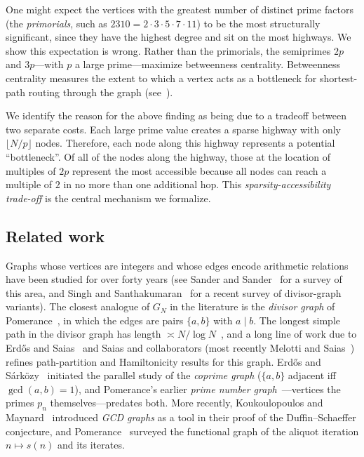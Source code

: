 \documentclass[11pt]{article}
\theoremstyle{plain}
\theoremstyle{definition}
\begin{document}
One might expect the vertices with the greatest number of distinct prime factors (the \emph{primorials}, such as $2310 = 2 \cdot 3 \cdot 5 \cdot 7 \cdot 11$)
to be the most structurally significant, since they have the highest degree and sit on the most highways. We show this expectation is wrong.
Rather than the primorials, the semiprimes $2p$ and $3p$---with $p$ a large prime---maximize betweenness centrality.
Betweenness centrality measures the extent to which a vertex acts as a bottleneck for shortest-path routing through the graph (see~\cite{Freeman1977}).

We identify the reason for the above finding as being due to a tradeoff between two separate costs.
Each large prime value creates a sparse highway with only $\lfloor N/p \rfloor$ nodes. Therefore, each node along this
highway represents a potential ``bottleneck''. Of all of the nodes along the highway,
those at the location of multiples of $2p$ represent the most accessible because all nodes can reach
a multiple of $2$ in no more than one additional hop. This \emph{sparsity-accessibility trade-off} is the central mechanism we formalize.

\subsection{Related work}\label{subsec:related}
Graphs whose vertices are integers and whose edges encode arithmetic relations have been studied for over forty years
(see Sander and Sander~\cite{SanderSander2016} for a survey of this area, and Singh and Santhakumaran~\cite{SinghSantha2023} for
a recent survey of divisor-graph variants).
The closest analogue of $G_N$ in the literature is the \emph{divisor graph} of Pomerance~\cite{Pomerance1983},
in which the edges are pairs $\{a, b\}$ with $a \mid b$. The longest simple path in the divisor graph
has length $\asymp N/\log N$~\cite{Pomerance1983}, and a long line of work due to Erd\H{o}s and Saias~\cite{ErdosSaias1995}
and Saias and collaborators (most recently Melotti and Saias~\cite{MelottiSaias2020}) refines path-partition and
Hamiltonicity results for this graph. Erd\H{o}s and S\'ark\"ozy~\cite{ErdosSarkozy1997} initiated the parallel study
of the \emph{coprime graph} ($\{a, b\}$ adjacent iff $\gcd(a, b) = 1$), and Pomerance's earlier
\emph{prime number graph}~\cite{Pomerance1979}---vertices the primes $p_n$ themselves---predates both.
More recently, Koukoulopoulos and Maynard~\cite{KoukoulopoulosMaynard2020} introduced \emph{GCD graphs} as a tool
in their proof of the Duffin--Schaeffer conjecture, and Pomerance~\cite{Pomerance2018}
surveyed the functional graph of the aliquot iteration $n \mapsto s(n)$ and its iterates.
\end{document}
